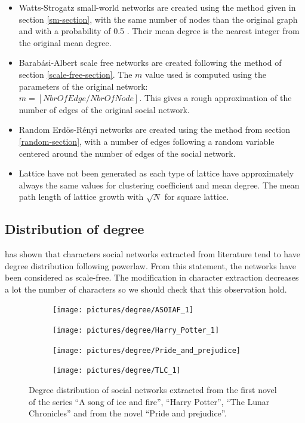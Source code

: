 \documentclass[a4paper, 12pt]{report}
\begin{document}
\begin{itemize}
\item Watts-Strogatz small-world networks are created using the method given in section \ref{sm-section}, with the same number of nodes than the original graph and with a probability of 0.5 . Their mean degree is the nearest integer from the original mean degree.
\item Barabási-Albert scale free networks are created following the method of section \ref{scale-free-section}. The $m$ value used is computed using the parameters of the original network:\\
 $m = [NbrOfEdge / NbrOfNode]$. This gives a rough approximation of the number of edges of the original social network.
\item Random Erdös-Rényi networks are created using the method from section \ref{random-section}, with a number of edges following a random variable centered around the number of edges of the social network.
\item Lattice have not been generated as each type of lattice have approximately always the same values for clustering coefficient and mean degree. The mean path length of lattice growth with $\sqrt{N}$ for square lattice.
\end{itemize}

\subsection{Distribution of degree}
\cite{original} has shown that characters social networks extracted from literature tend to have degree distribution following powerlaw. From this statement, the networks have been considered as scale-free. The modification in character extraction decreases a lot the number of characters so we should check that this observation hold.\\

\begin{figure}
\begin{subfigure}{.49\textwidth}
\centering
\texttt{[image: pictures/degree/ASOIAF\_1]}
\end{subfigure}
\hfill
\begin{subfigure}{.49\textwidth}
\centering
\texttt{[image: pictures/degree/Harry\_Potter\_1]}
\end{subfigure}
\hfill
\begin{subfigure}{.49\textwidth}
\centering
\texttt{[image: pictures/degree/Pride\_and\_prejudice]}
\end{subfigure}
\begin{subfigure}{.49\textwidth}
\centering
\texttt{[image: pictures/degree/TLC\_1]}
\end{subfigure}
\caption{Degree distribution of social networks extracted from the first novel of the series ``A song of ice and fire'', ``Harry Potter'', ``The Lunar Chronicles'' and from  the novel ``Pride and prejudice''.}
\label{distrib_degree_4_novels}
\end{figure}
\end{document}
